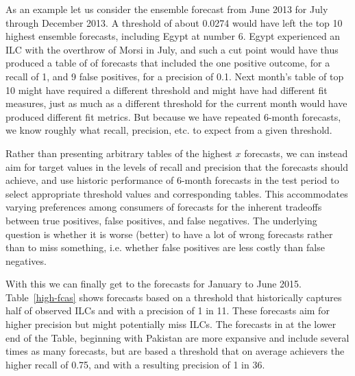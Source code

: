 \documentclass[pdftex,11pt]{article}
\begin{document}
As an example let us consider the ensemble forecast from June 2013 for July through December 2013. A threshold of about 0.0274 would have left the top 10 highest ensemble forecasts, including Egypt at number 6. Egypt experienced an ILC with the overthrow of Morsi in July, and such a cut point would have thus produced a table of of forecasts that included the one positive outcome, for a recall of 1, and 9 false positives, for a precision of 0.1. Next month's table of top 10 might have required a different threshold and might have had different fit measures, just as much as a different threshold for the current month would have produced different fit metrics. But because we have repeated 6-month forecasts, we know roughly what recall, precision, etc. to expect from a given threshold. 

Rather than presenting arbitrary tables of the highest $x$ forecasts, we can instead aim for target values in the levels of recall and precision that the forecasts should achieve, and use historic performance of 6-month forecasts in the test period to select appropriate threshold values and corresponding tables. This accommodates varying preferences among consumers of forecasts for the inherent tradeoffs between true positives, false positives, and false negatives. The underlying question is whether it is worse (better) to have a lot of wrong forecasts rather than to miss something, i.e. whether false positives are less costly than false negatives. 

With this we can finally get to the forecasts for January to June 2015. Table~\ref{high-fcas} shows forecasts based on a threshold that historically captures half of observed ILCs and with a precision of 1 in 11. These forecasts aim for higher precision but might potentially miss ILCs. The forecasts in at the lower end of the Table, beginning with Pakistan are more expansive and include several times as many forecasts, but are based a threshold that on average achievers the higher recall of 0.75, and with a resulting precision of 1 in 36. 
\end{document}
